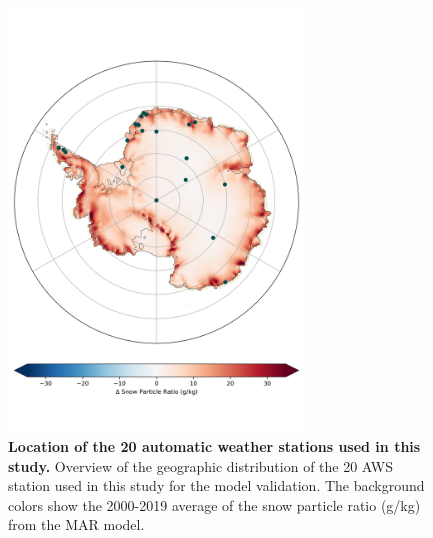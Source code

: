 \documentclass[draft,grl]{agutexSI2019}
\begin{document}
\begin{figure}[H]
	\includegraphics[width=0.7\textwidth]{station_map.png}
	\caption{\textbf{Location of the 20 automatic weather stations used in this study.} Overview of the geographic distribution of the 20 AWS station used in this study for the model validation. The background colors show the 2000-2019 average of the snow particle ratio (g/kg) from the MAR model.}
	\label{fig:stations}
\end{figure}


\end{document}
